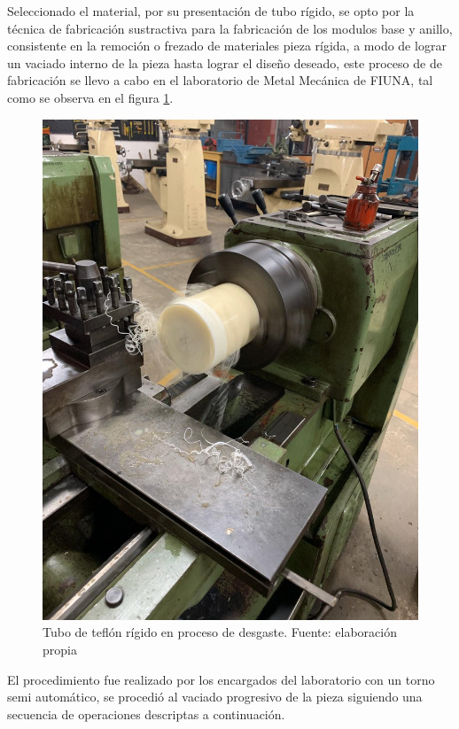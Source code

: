 Seleccionado el material, por su presentaci\'on de tubo r\'igido, se opto por la t\'ecnica de fabricaci\'on sustractiva para la fabricaci\'on de los modulos base y anillo, consistente en la remoci\'on o frezado de materiales pieza r\'igida, a modo de lograr un vaciado interno de la pieza hasta lograr el dise\~no deseado, este proceso de de fabricaci\'on se llevo a cabo en el laboratorio de Metal Mec\'anica de FIUNA, tal como se observa en el figura \ref{fig:preparacion}.
\begin{figure}[H]
\centering
\includegraphics[scale=0.2]{Imagenes/2019/Sonda_Fab0.jpeg} 
\caption{Tubo de tefl\'on r\'igido en proceso de desgaste. Fuente: elaboraci\'on propia}
\label{fig:preparacion}
\end{figure}
El procedimiento fue realizado por los encargados del laboratorio con un torno semi autom\'atico, se procedi\'o al vaciado progresivo de la pieza siguiendo una secuencia de operaciones descriptas a continuaci\'on.

